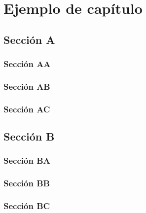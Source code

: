 \documentclass{TesisTipoUli}
\begin{document}
	\frontmatter
	
	
	
	\dominitoc
	\tableofcontents
	\adjustmtc
	
	\listoffigures
	
	\listoftables
	
	\newpage
	
	
	
	\mainmatter
	
	
	\chapter{Ejemplo de capítulo}
	\minitoc
	
	\section{Sección A}
	
	\subsection{Sección AA}
	\subsection{Sección AB}
	\subsection{Sección AC}
	
	\section{Sección B}
	
	\subsection{Sección BA}
	\subsection{Sección BB}
	\subsection{Sección BC}
	
	
		
	
	
	
	
	\backmatter
	
	
\end{document}

